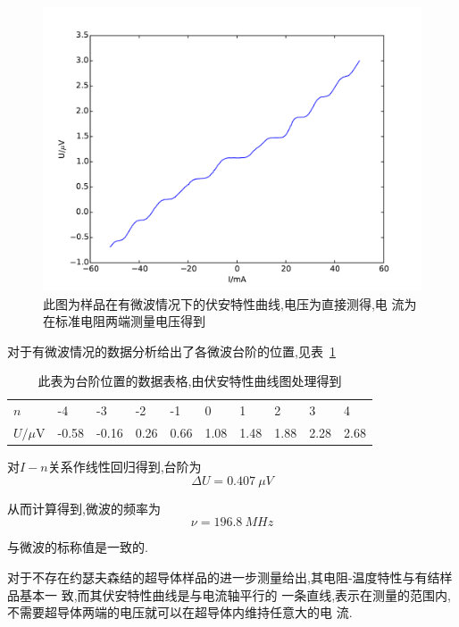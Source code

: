\documentclass[aps,pre,12pt,preprint,onecolumn,showpacs,showkeys]{revtex4-1}
\begin{document}
\begin{figure}[Htbp]
  \centering
\includegraphics[width=\textwidth]{vt2.pdf}
\caption{\label{fig:vt2}此图为样品在有微波情况下的伏安特性曲线,电压为直接测得,电
流为在标准电阻两端测量电压得到}
\end{figure}

对于有微波情况的数据分析给出了各微波台阶的位置,见表~\ref{tab:stairs}

\begin{table}[Htbp]
  \caption{\label{tab:stairs}%
    此表为台阶位置的数据表格,由伏安特性曲线图处理得到}
\begin{ruledtabular}
  \begin{tabular}{llllllllll}
$n$ &-4&-3&-2&-1&0&1&2&3&4 \\
$U/\mu\text{V}$&-0.58&-0.16&0.26&0.66&1.08&1.48&1.88&2.28&2.68
\end{tabular}
\end{ruledtabular}
\end{table}

对$I-n$关系作线性回归得到,台阶为
\begin{equation}
    \Delta U = \SI{0.407}{\mu V}
\end{equation}

从而计算得到,微波的频率为
\begin{equation}
    \nu = \SI{196.8}{MHz}
\end{equation}

与微波的标称值是一致的.

对于不存在约瑟夫森结的超导体样品的进一步测量给出,其电阻-温度特性与有结样品基本一
致,而其伏安特性曲线是与电流轴平行的
一条直线,表示在测量的范围内,不需要超导体两端的电压就可以在超导体内维持任意大的电
流.
\end{document}
